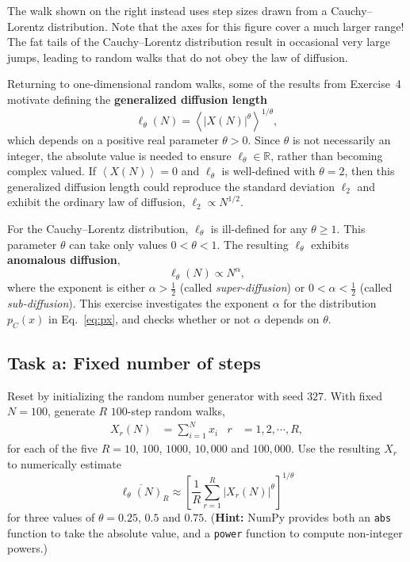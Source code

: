 \documentclass[12 pt]{article} %
\newcommand{\Rbb}{\ensuremath{\mathbb R} }
\newcommand{\al}{\ensuremath{\alpha} }
\newcommand{\vev}[1]{\ensuremath{\left\langle #1 \right\rangle} }
\newcommand{\eq}[1]{Eq.~\ref{#1}}
\begin{document}
The walk shown on the right instead uses step sizes drawn from a Cauchy--Lorentz distribution.
Note that the axes for this figure cover a much larger range!
The fat tails of the Cauchy--Lorentz distribution result in occasional very large jumps, leading to random walks that do not obey the law of diffusion.

Returning to one-dimensional random walks, some of the results from Exercise~4 motivate defining the \textbf{generalized diffusion length}
\begin{equation}
  \label{eq:diff_length}
  \ell_{\theta}(N) = \vev{|X(N)|^{\theta}}^{1 / \theta},
\end{equation}
which depends on a positive real parameter $\theta > 0$.
Since $\theta$ is not necessarily an integer, the absolute value is needed to ensure $\ell_{\theta} \in \Rbb$, rather than becoming complex valued.
If $\vev{X(N)} = 0$ and $\ell_{\theta}$ is well-defined with $\theta = 2$, then this generalized diffusion length could reproduce the standard deviation $\ell_2$ and exhibit the ordinary law of diffusion, $\ell_2 \propto N^{1 / 2}$.

For the Cauchy--Lorentz distribution, $\ell_{\theta}$ is ill-defined for any $\theta \geq 1$.
This parameter $\theta$ can take only values $0 < \theta < 1$.
The resulting $\ell_{\theta}$ exhibits \textbf{anomalous diffusion},
\begin{equation*}
  \ell_{\theta}(N) \propto N^{\al},
\end{equation*}
where the exponent is either $\al > \frac{1}{2}$ (called \textit{super-diffusion}) or $0 < \al < \frac{1}{2}$ (called \textit{sub-diffusion}).
This exercise investigates the exponent \al for the distribution $p_C(x)$ in \eq{eq:px}, and checks whether or not \al depends on $\theta$.

\newpage %
\subsection*{Task a: Fixed number of steps}
Reset by initializing the random number generator with seed $327$.
With fixed $N = 100$, generate $R$ $100$-step random walks,
\begin{align*}
  X_r(N) & = \sum_{i = 1}^N x_i &
  r & = 1, 2, \cdots, R,
\end{align*}
for each of the five $R = 10$, $100$, $1000$, $10{,}000$ and $100{,}000$.
Use the resulting $X_r$ to numerically estimate
\begin{equation*}
  \overline{\ell_{\theta}(N)}_R \approx \left[\frac{1}{R} \sum_{r = 1}^R \left|X_r(N)\right|^{\theta}\right]^{1 / \theta}
\end{equation*}
for three values of $\theta = 0.25$, $0.5$ and $0.75$.
(\textbf{Hint:} NumPy provides both an \texttt{abs} function to take the absolute value, and a \texttt{power} function to compute non-integer powers.)
\end{document}
